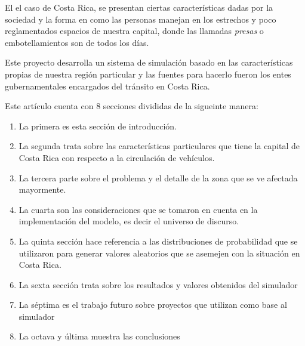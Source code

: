 \documentclass[conference]{IEEEtran}
\begin{document}
El el caso de Costa Rica, se presentan ciertas caracter\'isticas dadas por la sociedad y la forma en como las personas manejan en los estrechos y poco reglamentados espacios de nuestra capital, donde las llamadas \textit{presas} o embotellamientos son de todos los d\'ias.

Este proyecto desarrolla un sistema de simulaci\'on basado en las caracter\'isticas propias de nuestra regi\'on particular y las fuentes para hacerlo fueron los entes gubernamentales encargados del tr\'ansito en Costa Rica.

Este art\'iculo cuenta con 8 secciones divididas de la sigueinte manera:
\begin{enumerate}
\item La primera es esta secci\'on de introducci\'on.
\item La segunda trata sobre las caracter\'isticas particulares que tiene la capital de Costa Rica con respecto a la circulaci\'on de veh\'iculos. 
\item La tercera parte sobre el problema y el detalle de la zona que se ve afectada mayormente. 
\item La cuarta son las consideraciones que se tomaron en cuenta en la implementaci\'on del modelo, es decir el universo de discurso. 
\item La quinta secci\'on hace referencia a las distribuciones de probabilidad que se utilizaron para generar valores aleatorios que se asemejen con la situaci\'on en Costa Rica.
\item La sexta sección trata sobre los resultados y  valores obtenidos del simulador
\item La s\'eptima es el trabajo futuro sobre proyectos que utilizan como base al simulador
\item La octava y \'ultima muestra las conclusiones

\end{enumerate}
\end{document}
